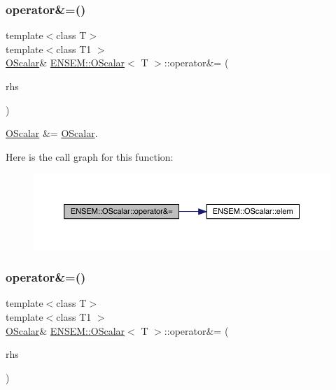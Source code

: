 \subsubsection{\texorpdfstring{operator\&=()}{operator\&=()}\hspace{0.1cm}{\footnotesize\ttfamily [1/3]}}
{\footnotesize\ttfamily template$<$class T$>$ \\
template$<$class T1 $>$ \\
\mbox{\hyperlink{classENSEM_1_1OScalar}{O\+Scalar}}\& \mbox{\hyperlink{classENSEM_1_1OScalar}{E\+N\+S\+E\+M\+::\+O\+Scalar}}$<$ T $>$\+::operator\&= (\begin{DoxyParamCaption}\item[{const \mbox{\hyperlink{classENSEM_1_1OScalar}{O\+Scalar}}$<$ T1 $>$ \&}]{rhs }\end{DoxyParamCaption})\hspace{0.3cm}{\ttfamily [inline]}}



\mbox{\hyperlink{classENSEM_1_1OScalar}{O\+Scalar}} \&= \mbox{\hyperlink{classENSEM_1_1OScalar}{O\+Scalar}}. 

Here is the call graph for this function\+:
\nopagebreak
\begin{figure}[H]
\begin{center}
\leavevmode
\includegraphics[width=350pt]{da/d80/classENSEM_1_1OScalar_a9a192875355f059d207c579e2514b2a3_cgraph}
\end{center}
\end{figure}
\mbox{\label{classENSEM_1_1OScalar_a9a192875355f059d207c579e2514b2a3}} 
\subsubsection{\texorpdfstring{operator\&=()}{operator\&=()}\hspace{0.1cm}{\footnotesize\ttfamily [2/3]}}
{\footnotesize\ttfamily template$<$class T$>$ \\
template$<$class T1 $>$ \\
\mbox{\hyperlink{classENSEM_1_1OScalar}{O\+Scalar}}\& \mbox{\hyperlink{classENSEM_1_1OScalar}{E\+N\+S\+E\+M\+::\+O\+Scalar}}$<$ T $>$\+::operator\&= (\begin{DoxyParamCaption}\item[{const \mbox{\hyperlink{classENSEM_1_1OScalar}{O\+Scalar}}$<$ T1 $>$ \&}]{rhs }\end{DoxyParamCaption})\hspace{0.3cm}{\ttfamily [inline]}}



